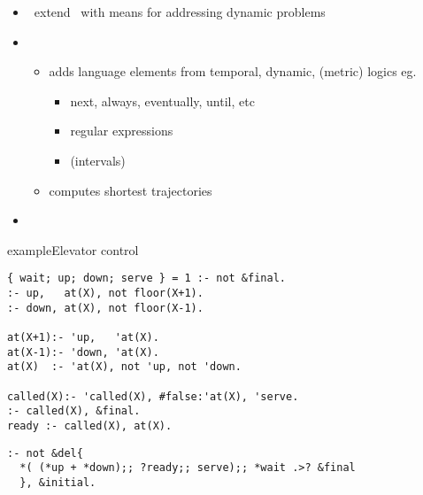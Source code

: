 \begin{frame}{\telingo}
  \begin{itemize}
  \item {} \ extend \clingo\ with means for addressing dynamic problems
  \item {} \
    \begin{itemize}
    \item adds language elements from temporal, dynamic, (metric) logics
      eg.\
      \begin{itemize}
      \item next, always, eventually, until, etc
      \item regular expressions
      \item (intervals)
      \end{itemize}
    \item computes shortest trajectories
    \end{itemize}
  \item {} \ \cite{cakamosc19a,cadilasc20a}
  \end{itemize}
\end{frame}
\begin{frame}[fragile,shrink]{example}{Elevator control}
\begin{lstlisting}[language=clingo,basicstyle=\small\ttfamily]
{ wait; up; down; serve } = 1 :- not &final.
:- up,   at(X), not floor(X+1).
:- down, at(X), not floor(X-1).

at(X+1):- 'up,   'at(X).
at(X-1):- 'down, 'at(X).
at(X)  :- 'at(X), not 'up, not 'down.

called(X):- 'called(X), #false:'at(X), 'serve.
:- called(X), &final.
ready :- called(X), at(X).
\end{lstlisting}
\pause
\begin{lstlisting}[language=clingo,basicstyle=\small\ttfamily]
:- not &del{
  *( (*up + *down);; ?ready;; serve);; *wait .>? &final
  }, &initial.
\end{lstlisting}
\end{frame}
%
